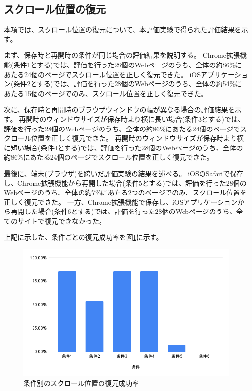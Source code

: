 \subsection{スクロール位置の復元}
本項では、スクロール位置の復元について、本評価実験で得られた評価結果を示す。

まず、保存時と再開時の条件が同じ場合の評価結果を説明する。
Chrome拡張機能(条件1とする)では、評価を行った28個のWebページのうち、全体の約86\%にあたる24個のページでスクロール位置を正しく復元できた。
iOSアプリケーション(条件2とする)では、評価を行った28個のWebページのうち、全体の約54\%にあたる15個のページでのみ、スクロール位置を正しく復元できた。

次に、保存時と再開時のブラウザウィンドウの幅が異なる場合の評価結果を示す。
再開時のウィンドウサイズが保存時より横に長い場合(条件3とする)では、評価を行った28個のWebページのうち、全体の約86\%にあたる24個のページでスクロール位置を正しく復元できた。
再開時のウィンドウサイズが保存時より横に短い場合(条件4とする)では、評価を行った28個のWebページのうち、全体の約86\%にあたる24個のページでスクロール位置を正しく復元できた。

最後に、端末(ブラウザ)を跨いだ評価実験の結果を述べる。
iOSのSafariで保存し、Chrome拡張機能から再開した場合(条件5とする)では、評価を行った28個のWebページのうち、全体の約7\%にあたる2つのページでのみ、スクロール位置を正しく復元できた。
一方、Chrome拡張機能で保存し、iOSアプリケーションから再開した場合(条件6とする)では、評価を行った28個のWebページのうち、全てのサイトで復元できなかった。

上記に示した、条件ごとの復元成功率を図\ref{fig:success-rate-scroll-position}に示す。

\begin{figure}[htbp]
  \caption{条件別のスクロール位置の復元成功率}
  \label{fig:success-rate-scroll-position}
  \begin{center}
    \includegraphics[bb=0 0 600 371,width=15cm]{img/060_evaluation/result/scroll_position/success-rate-scroll-position.pdf}
  \end{center}
\end{figure}
